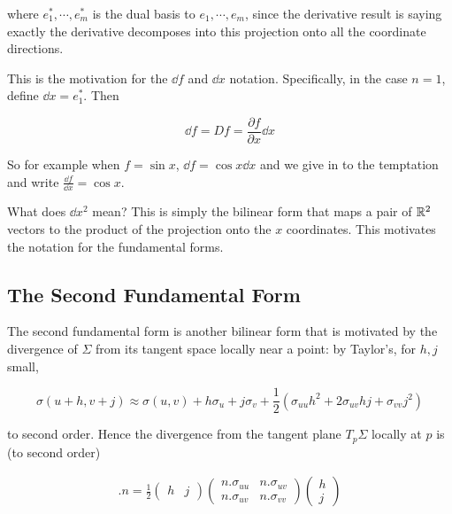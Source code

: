 \documentclass[11pt]{scrartcl}
\begin{document}
where $e_1^* , \cdots , e_m^*$ is the dual basis to $e_1, \cdots , e_m$, since the derivative result is saying exactly the derivative decomposes into this projection onto all the coordinate directions.

This is the motivation for the $\dd f$ and $\dd x$ notation. Specifically, in the case $n=1$, define $\dd x = e_1^*$. Then

\begin{equation}
    \dd f = Df = \frac{\partial f}{\partial x} \dd x
\end{equation}

So for example when $f = \sin x$, $\dd f = \cos x \dd x$ and we give in to the temptation and write $\frac{\dd f}{\dd x} = \cos x$.

What does $\dd x^2$ mean? This is simply the bilinear form that maps a pair of $\mathbb R^2$ vectors to the product of the projection onto the $x$ coordinates. This motivates the notation for the fundamental forms.

\subsection{The Second Fundamental Form}

The second fundamental form is another bilinear form that is motivated by the divergence of $\Sigma$ from its tangent space locally near a point: by Taylor's, for $h, j$ small,

\begin{equation}
\sigma(u+h,v+j) \approx \sigma(u,v) + h \sigma_u + j \sigma_v + 
\frac12 (\sigma_{uu}h^2 + 2\sigma_{uv}hj + \sigma_{vv}j^2)
\end{equation}

to second order. Hence the divergence from the tangent plane $T_p \Sigma$ locally at $p$ is (to second order)

\begin{align}
        [ \sigma(u+h,v+j) - \sigma(u,v) ].n 
        = \frac12 \begin{pmatrix}h & j\end{pmatrix} \begin{pmatrix} n.\sigma_{uu} & n.\sigma_{uv} \\ n.\sigma_{uv} & n.\sigma_{vv} \end{pmatrix} \begin{pmatrix} h\\ j \end{pmatrix}
\end{align} %
\end{document}
